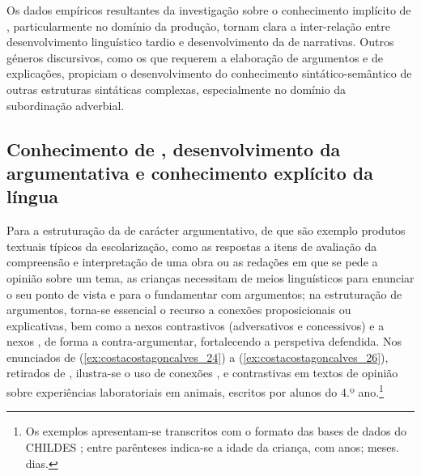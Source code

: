 \documentclass[output=paper]{LSP/langsci}
\begin{document}
Os dados empíricos resultantes da investigação sobre o conhecimento implícito de , particularmente no domínio da produção, tornam clara a inter-relação entre desenvolvimento linguístico tardio e desenvolvimento da  de narrativas. Outros géneros discursivos, como os que requerem a elaboração de argumentos e de explicações, propiciam o desenvolvimento do conhecimento sintático-semântico de outras estruturas sintáticas complexas, especialmente no domínio da subordinação adverbial. 

\subsection{Conhecimento de , desenvolvimento da  argumentativa e conhecimento explícito da língua}
\label{subsec:costacostagoncalves_conhecimento_concess}

Para a estruturação da  de carácter argumentativo, de que são exemplo produtos textuais típicos da escolarização, como as respostas a itens de avaliação da compreensão e interpretação de uma obra ou as redações em que se pede a opinião sobre um tema, as crianças necessitam de meios linguísticos para enunciar o seu ponto de vista e para o fundamentar com argumentos; na estruturação de argumentos, torna-se essencial o recurso a conexões proposicionais  ou explicativas, bem como a nexos contrastivos (adversativos e concessivos) e a nexos , de forma a contra‑argumentar, fortalecendo a perspetiva defendida. Nos enunciados de (\ref{ex:costacostagoncalves_24}) a (\ref{ex:costacostagoncalves_26}), retirados de \citet{alcosta2010}, ilustra-se o uso de conexões ,  e contrastivas em textos de opinião sobre experiências laboratoriais em animais, escritos por alunos do 4.º ano.\footnote{Os exemplos apresentam-se transcritos com o formato das bases de dados do CHILDES \citep{macwhinney2000}; entre parênteses indica-se a idade da criança, com anos; meses. dias.}

\z
{}\z
{}\z
\end{document}
